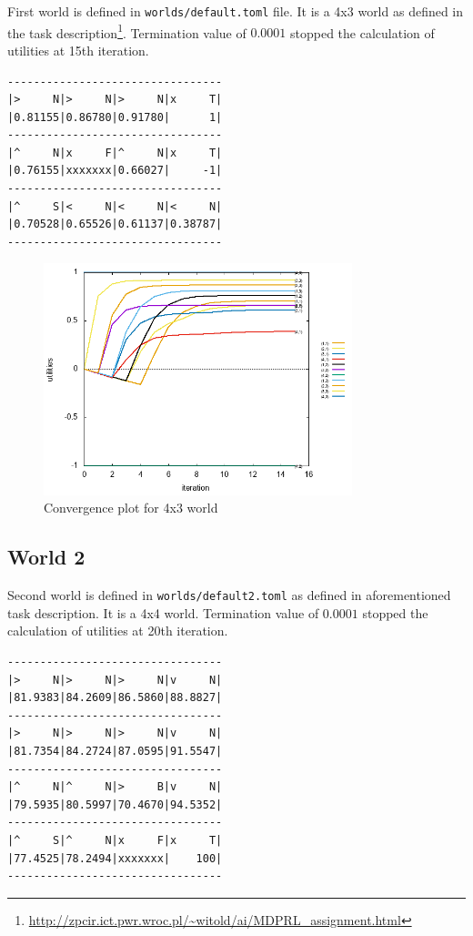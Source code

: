 \documentclass[12pt,a4paper]{article} %
\begin{document}
First world is defined in \texttt{worlds/default.toml} file. It is a 4x3 world as defined in the task description\footnote{\url{http://zpcir.ict.pwr.wroc.pl/~witold/ai/MDPRL_assignment.html}}. Termination value of $0.0001$ stopped the calculation of utilities at 15th iteration.

\begin{lstlisting}[caption={Results of MDP utility value calculation for 4x3 world. Upper left corner of each field describes the policy, upper right - type of the field (S - start, N - normal, F - forbidden, T - terminal), bottom - utility value.}]
---------------------------------
|>     N|>     N|>     N|x     T|
|0.81155|0.86780|0.91780|      1|
---------------------------------
|^     N|x     F|^     N|x     T|
|0.76155|xxxxxxx|0.66027|     -1|
---------------------------------
|^     S|<     N|<     N|<     N|
|0.70528|0.65526|0.61137|0.38787|
---------------------------------
\end{lstlisting}

\begin{figure}[H]
\centering
	\includegraphics[width=0.8\textwidth]{../results/default.png}
	\caption{Convergence plot for 4x3 world}
	\label{w1}
\end{figure}


\subsection{World 2}

Second world is defined in \texttt{worlds/default2.toml} as defined in aforementioned task description. It is a 4x4 world. Termination value of $0.0001$ stopped the calculation of utilities at 20th iteration.


\begin{lstlisting}[caption={Results of MDP utility value calculation for 4x4 world. Field marked as B is a special field.}]
---------------------------------
|>     N|>     N|>     N|v     N|
|81.9383|84.2609|86.5860|88.8827|
---------------------------------
|>     N|>     N|>     N|v     N|
|81.7354|84.2724|87.0595|91.5547|
---------------------------------
|^     N|^     N|>     B|v     N|
|79.5935|80.5997|70.4670|94.5352|
---------------------------------
|^     S|^     N|x     F|x     T|
|77.4525|78.2494|xxxxxxx|    100|
---------------------------------
\end{lstlisting}
\end{document}
